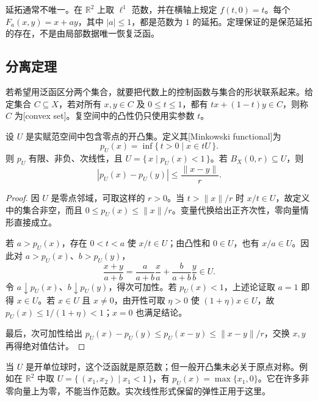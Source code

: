 延拓通常不唯一。在 \(\mathbb R^2\) 上取 \(\ell^1\) 范数，并在横轴上规定 \(f(t,0)=t\)。每个 \(F_a(x,y)=x+ay\)，其中 \(|a|\leq1\)，都是范数为 \(1\) 的延拓。定理保证的是保范延拓的存在，不是由局部数据唯一恢复泛函。

\subsection{分离定理}
\label{b1:subsec:080203}

若希望用泛函区分两个集合，就要把代数上的控制函数与集合的形状联系起来。给定集合 \(C\subseteq X\)，若对所有 \(x,y\in C\) 及 \(0\leq t\leq1\)，都有 \(tx+(1-t)y\in C\)，则称 \(C\) 为[convex set]。复空间中的凸性仍只使用实参数 \(t\)。

\begin{lemma}\label{b1:lem:minkowski-functional}
设 \(U\) 是实赋范空间中包含零点的开凸集。定义其[Minkowski functional]为
\[
p_U(x)=\inf\{\,t>0\mid x\in tU\,\}.
\]
则 \(p_U\) 有限、非负、次线性，且 \(U=\{\,x\mid p_U(x)<1\,\}\)。若 \(B_X(0,r)\subseteq U\)，则
\[
|p_U(x)-p_U(y)|\leq\dfrac{\|x-y\|}{r}.
\]
\end{lemma}
\begin{proof}
因 \(U\) 是零点邻域，可取这样的 \(r>0\)。当 \(t>\|x\|/r\) 时 \(x/t\in U\)，故定义中的集合非空，而且 \(0\leq p_U(x)\leq\|x\|/r\)。变量代换给出正齐次性，零向量情形直接成立。

若 \(a>p_U(x)\)，存在 \(0<t<a\) 使 \(x/t\in U\)；由凸性和 \(0\in U\)，也有 \(x/a\in U\)。因此对 \(a>p_U(x)\)、\(b>p_U(y)\)，
\[
\dfrac{x+y}{a+b}
=\dfrac{a}{a+b}\dfrac{x}{a}
+\dfrac{b}{a+b}\dfrac{y}{b}\in U.
\]
令 \(a\downarrow p_U(x)\)、\(b\downarrow p_U(y)\)，得次可加性。若 \(p_U(x)<1\)，上述论证取 \(a=1\) 即得 \(x\in U\)。若 \(x\in U\) 且 \(x\ne0\)，由开性可取 \(\eta>0\) 使 \((1+\eta)x\in U\)，故 \(p_U(x)\leq1/(1+\eta)<1\)；\(x=0\) 也满足结论。

最后，次可加性给出 \(p_U(x)-p_U(y)\leq p_U(x-y)\leq\|x-y\|/r\)，交换 \(x,y\) 再得绝对值估计。
\end{proof}

当 \(U\) 是开单位球时，这个泛函就是原范数；但一般开凸集未必关于原点对称。例如在 \(\mathbb R^2\) 中取 \(U=\{\,(x_1,x_2)\mid x_1<1\,\}\)，有 \(p_U(x)=\max\{x_1,0\}\)。它在许多非零向量上为零，不能当作范数。实次线性形式保留的弹性正用于这里。

